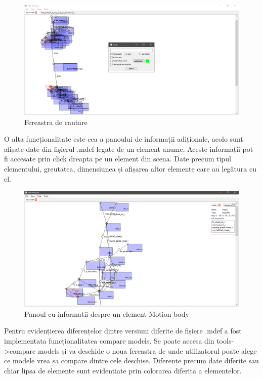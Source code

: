 \begin{figure}[H]
    \includegraphics[width=\linewidth]{imagini/implementare/searchwindow.png}
    \caption{Fereastra de cautare}
    \label{fig:tabs}
\end{figure}

O alta funcționalitate este cea a panoului de informații adiționale, acolo sunt afișate date din fișierul .mdef legate de un element 
anume. Aceste informații pot fi accesate prin click dreapta pe un element din scena. Date precum tipul elementului, greutatea, 
dimensiunea și afișarea altor elemente care au legătura cu el.\newline 

\begin{figure}[H]
    \includegraphics[width=\linewidth]{imagini/implementare/info.png}
    \caption{Panoul cu informatii despre un element Motion body}
    \label{fig:tabs}
\end{figure}

Pentru evidențierea diferențelor dintre versiuni diferite de 
fișiere .mdef a fost implementata funcționalitatea compare models. Se poate accesa din tools->compare models și va deschide 
o noua fereastra de unde utilizatorul poate alege ce modele vrea sa compare dintre cele deschise. Diferențe precum date diferite 
sau chiar lipsa de elemente sunt evidentiate prin colorarea diferita a elementelor.\newline 

